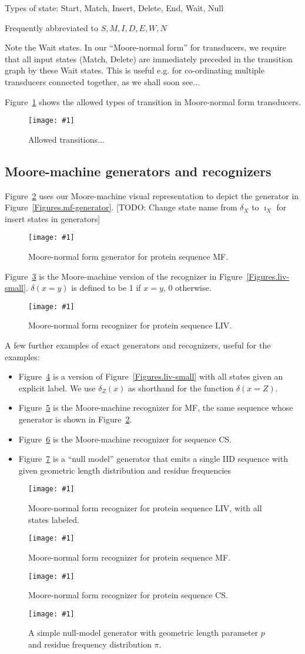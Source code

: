 \documentclass{article}
\newcommand{\figref}[1]{Figure~\ref{Figures.#1}}
\newcommand{\figlabel}[1]{\label{Figures.#1}}
\newcommand{\todo}[1]{[TODO: #1]}
\newcommand{\easyfig}[4]{
\begin{figure}
\texttt{[image: \#1]}
\caption{ \figlabel{#3} #4}
\end{figure}}
\newcommand{\pdffig}[2]{\easyfig{#1-fig.pdf}{}{#1}{#2}}
\newcommand{\tallpdffig}[2]{\easyfig{#1-fig.pdf}{height=\textheight}{#1}{#2}}
\begin{document}
Types of state: Start, Match, Insert, Delete, End, Wait, Null

Frequently abbreviated to $S,M,I,D,E,W,N$

Note the Wait states.
In our ``Moore-normal form'' for transducers, we require that all input states (Match, Delete)
are immediately preceded in the transition graph by these Wait states.
This is useful e.g. for co-ordinating multiple transducers connected together, as we shall soon see...

\figref{transitions} shows the allowed types of transition in Moore-normal form transducers.
\pdffig{transitions}{Allowed transitions...}


\subsection{Moore-machine generators and recognizers}

\figref{moore-mf-generator} uses our Moore-machine visual representation
to depict the generator in \figref{mf-generator}.
\todo{Change state name from $\delta_X$ to $\imath_X$ for insert states in generators}

\pdffig{moore-mf-generator}{Moore-normal form generator for protein sequence MF.}

\figref{liv} is the Moore-machine version of the recognizer in \figref{liv-small}.
$\delta(x=y)$ is defined to be 1 if $x=y$, 0 otherwise.

\pdffig{liv}{Moore-normal form recognizer for protein sequence LIV.}

A few further examples of exact generators and recognizers, useful for the examples:
\begin{itemize}
\item \figref{liv-labeled} is a version of \figref{liv-small} with all states given an explicit label.
We use $\delta_Z(x)$ as shorthand for the function $\delta(x=Z)$.
\item \figref{mf-labeled} is the Moore-machine recognizer for MF,
the same sequence whose generator is shown in \figref{moore-mf-generator}.
\item \figref{cs-labeled} is the Moore-machine recognizer for sequence CS.
\item \figref{null-model} is a ``null model'' generator that emits a single IID sequence
with given geometric length distribution and residue frequencies
\end{itemize}

\tallpdffig{liv-labeled}{Moore-normal form recognizer for protein sequence LIV, with all states labeled.}
\pdffig{mf-labeled}{Moore-normal form recognizer for protein sequence MF.}
\pdffig{cs-labeled}{Moore-normal form recognizer for protein sequence CS.}
\pdffig{null-model}{A simple null-model generator with geometric length parameter $p$ and residue frequency distribution $\pi$.}
\end{document}
